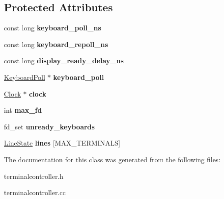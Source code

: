 \subsection*{Protected Attributes}
\begin{DoxyCompactItemize}
\item 
\hypertarget{classTerminalController_a33f5df34e7dfe739abd1917086a6951a}{
const long {\bfseries keyboard\_\-poll\_\-ns}}
\label{classTerminalController_a33f5df34e7dfe739abd1917086a6951a}

\item 
\hypertarget{classTerminalController_a9e1ac2e3cddddb5030363e5f307a4072}{
const long {\bfseries keyboard\_\-repoll\_\-ns}}
\label{classTerminalController_a9e1ac2e3cddddb5030363e5f307a4072}

\item 
\hypertarget{classTerminalController_a610627e857d986c28e833ee814b58707}{
const long {\bfseries display\_\-ready\_\-delay\_\-ns}}
\label{classTerminalController_a610627e857d986c28e833ee814b58707}

\item 
\hypertarget{classTerminalController_a8a717f21efebbc0355a617cdba2f058d}{
\hyperlink{classTerminalController_1_1KeyboardPoll}{KeyboardPoll} $\ast$ {\bfseries keyboard\_\-poll}}
\label{classTerminalController_a8a717f21efebbc0355a617cdba2f058d}

\item 
\hypertarget{classTerminalController_a06b8c5b177712c24a257c500116b7044}{
\hyperlink{classClock}{Clock} $\ast$ {\bfseries clock}}
\label{classTerminalController_a06b8c5b177712c24a257c500116b7044}

\item 
\hypertarget{classTerminalController_aaa95a9790c6ba7ed5901ae06431c29d6}{
int {\bfseries max\_\-fd}}
\label{classTerminalController_aaa95a9790c6ba7ed5901ae06431c29d6}

\item 
\hypertarget{classTerminalController_ae646b89a2d0ecd3b056d86c655064060}{
fd\_\-set {\bfseries unready\_\-keyboards}}
\label{classTerminalController_ae646b89a2d0ecd3b056d86c655064060}

\item 
\hypertarget{classTerminalController_a8396e3aef90eecaa4e97e31be16cac55}{
\hyperlink{structTerminalController_1_1LineState}{LineState} {\bfseries lines} \mbox{[}MAX\_\-TERMINALS\mbox{]}}
\label{classTerminalController_a8396e3aef90eecaa4e97e31be16cac55}

\end{DoxyCompactItemize}


The documentation for this class was generated from the following files:\begin{DoxyCompactItemize}
\item 
terminalcontroller.h\item 
terminalcontroller.cc\end{DoxyCompactItemize}
